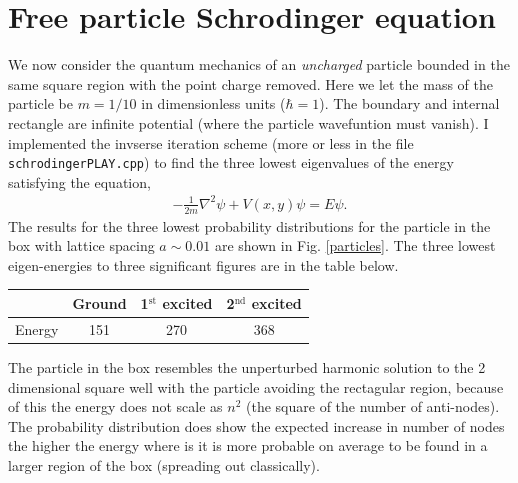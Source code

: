 \documentclass[singlepage,notitlepage,nofootinbib,11pt]{revtex4-1}
\begin{document}
\section{Free particle Schrodinger equation}
We now consider the quantum mechanics of an {\it uncharged} particle bounded in the same square region with the point charge removed. Here we let the mass of the particle be $m=1/10$ in dimensionless units ($\hbar = 1$). The boundary and internal rectangle are infinite potential (where the particle wavefuntion must vanish). I implemented the invserse iteration scheme (more or less in the file \texttt{schrodingerPLAY.cpp}) to find the three lowest eigenvalues of the energy satisfying the equation,
\begin{align*}
  -\frac{1}{2m} \nabla^2\psi + V(x,y)\psi = E\psi.
\end{align*}
The results for the three lowest probability distributions for the particle in the box with lattice spacing $a\sim0.01$ are shown in Fig. \ref{particles}. The three lowest eigen-energies to three significant figures are in the table below.
\begin{center}
  \begin{tabular}{ c | c | c | c }
    \hspace{1pt} & Ground & 1$^{\text{st}}$ excited & 2$^{\text{nd}}$ excited \\ \hline
    Energy & 151 & 270 & 368
    \end{tabular}
\end{center}
The particle in the box resembles the unperturbed harmonic solution to the 2 dimensional square well with the particle avoiding the rectagular region, because of this the energy does not scale as $n^2$ (the square of the number of anti-nodes). The probability distribution does show the expected increase in number of nodes the higher the energy where is it is more probable on average to be found in a larger region of the box (spreading out classically).
\end{document}

